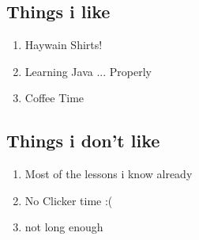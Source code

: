 \documentclass[a4paper]{article}
\begin{document}
\subsection{Things i like}
\begin{enumerate}
  \item Haywain Shirts!
  \item Learning Java ... Properly
  \item Coffee Time
\end{enumerate}
\subsection{Things i don't like}
\begin{enumerate}
  \item Most of the lessons i know already
  \item No Clicker time :(
  \item not long enough
\end{enumerate}
\end{document}
